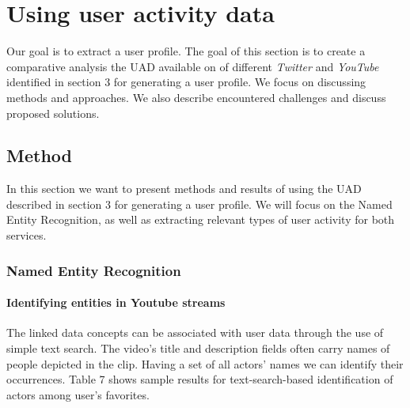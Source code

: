 \section{Using user activity data}
Our goal is to extract a user profile. The goal of this section is to create a comparative analysis the UAD
available on of different \textit{Twitter} and \textit{YouTube} identified in section 3 for generating a user profile.
We focus on discussing methods and approaches. We also describe encountered challenges and discuss proposed solutions.

\subsection{Method}
In this section we want to present methods and results of using the UAD described in section 3 for generating a user
profile. We will focus on the Named Entity Recognition, as well as extracting relevant types of user activity
for both services.

\subsubsection{Named Entity Recognition}

\paragraph{Identifying entities in Youtube streams}
The linked data concepts can be associated with user data through the use of
simple text search. The video's title and description fields often carry names
of people depicted in the clip. Having a set of all actors' names we can
identify their occurrences. Table 7 shows sample results for text-search-based
identification of actors among user's favorites.

